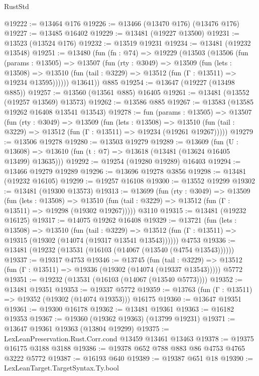 \begin{lexlean}{RustStd}
\begin{coremodule}
@19222 := @13464 @176
@19226 := @13466 (@13470 @176) (@13476 @176)
@19227 := @13485 @16402
@19229 := @13481 (@19227 @13500)
@19231 := @13523 (@13524 @176)
@19232 := @13519 @19231
@19234 := @13481 (@19232 @13548)
@19251 := @13480
    (fun (fn : @74) =>
    @19229
      (@13503
        (@13506
          (fun (params : @13505) =>
          @13507
            (fun (rty : @3049) =>
            @13509
              (fun (lets : @13508) =>
              @13510 (fun (tail : @3229) => @13512 (fun (Γ : @13511) => @19234 @13595))))))
        @13641))
    @885
@19254 := @13647 (@19227 (@13498 @885))
@19257 := @13560 (@13561 @885) @16405
@19261 := @13481 (@13552 (@19257 @13569) @13573)
@19262 := @13586 @885
@19267 := @13583 (@13585 @19262 @16408 @13541 @13543)
@19278 := fun (params : @13505) =>
  @13507
    (fun (rty : @3049) =>
    @13509
      (fun (lets : @13508) =>
      @13510 (fun (tail : @3229) => @13512 (fun (Γ : @13511) => @19234 (@19261 @19267)))))
@19279 := @13506 @19278
@19280 := @13503 @19279
@19289 := @13609
    (fun (U : @13608) => @13610 (fun (t : @7) => @13618 (@13481 (@13624 @16405 @13499) @13635)))
@19292 := @19254 (@19280 @19289) @16403
@19294 := @13466 @19279 @19289
@19296 := @13696 @19278 @3856
@19298 := @13481 (@19232 @16105)
@19299 := @19257 @16108
@19300 := @13552 @19299
@19302 := @13481 (@19300 @13573)
@19313 := @13699
    (fun (rty : @3049) =>
    @13509
      (fun (lets : @13508) =>
      @13510 (fun (tail : @3229) => @13512 (fun (Γ : @13511) => @19298 (@19302 @19267)))))
    @3110
@19315 := @13481 (@19232 @16125)
@19317 := @14075 @19262 @16408
@19329 := @13721
    (fun (lets : @13508) =>
    @13510
      (fun (tail : @3229) =>
      @13512 (fun (Γ : @13511) => @19315 (@19302 (@14074 (@19317 @13541 @13543))))))
    @4753
@19336 := @13481 (@19232 (@13531 (@16103 (@14067 (@13540 (@4754 @13543))))))
@19337 := @19317 @4753
@19346 := @13745
    (fun (tail : @3229) => @13512 (fun (Γ : @13511) => @19336 (@19302 (@14074 (@19337 @13543)))))
    @5772
@19351 := @19232 (@13531 (@16103 (@14067 (@13540 @5773))))
@19352 := @13481 @19351
@19353 := @19337 @5772
@19359 := @13763 (fun (Γ : @13511) => @19352 (@19302 (@14074 @19353))) @16175
@19360 := @13647 @19351
@19361 := @19300 @16178
@19362 := @13481 @19361
@19363 := @16182 @19353
@19367 := @19360 (@19362 @19363) (@13799 @19231)
@19371 := @13647 @19361 @19363 (@13804 @19299)
@19375 := LexLeanPreservation.Rust.Corr.cond @13459 @13461 @13463
@19378 := @19375 @16175 @3188 @3188
@19386 := @19378 @652 @788 @883 @86 @4753 @4765 @3222 @5772
@19387 := @16193 @640
@19389 := @19387 @651 @18
@19390 := LexLeanTarget.TargetSyntax.Ty.bool

\end{coremodule}
\end{lexlean}
